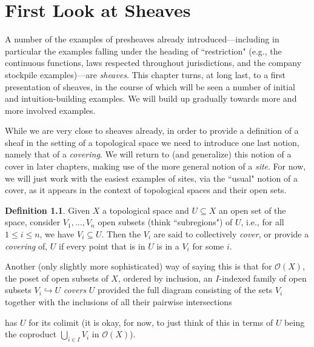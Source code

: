 \documentclass[11pt]{book}
\theoremstyle{definition}
\theoremstyle{definition}
\newtheorem{definition}{Definition}[section]
\theoremstyle{definition}
\theoremstyle{theorem}
\theoremstyle{definition}
\begin{document}
\chapter{First Look at Sheaves}
		A number of the examples of presheaves already introduced---including in particular the examples falling under the heading of ``restriction" (e.g., the continuous functions,  laws respected throughout jurisdictions, and the company stockpile examples)---are \textit{sheaves}. This chapter turns, at long last, to a first presentation of sheaves, in the course of which will be seen a number of initial and intuition-building examples. We will build up gradually towards more and more involved examples. \par 
		While we are very close to sheaves already, in order to provide a definition of a sheaf in the setting of a topological space we need to introduce one last notion, namely that of a \textit{covering}. We will return to (and generalize) this notion of a cover in later chapters, making use of the more general notion of a \textit{site}. For now, we will just work with the easiest examples of sites, via the ``usual" notion of a cover, as it appears in the context of topological spaces and their open sets. 
		\begin{definition}
			Given $X$ a topological space and $U \subseteq  X$ an open set of the space, consider $V_1,\dots, V_n$ open subsets (think ``subregions") of $U$, i.e., for all $1 \leq i \leq n$, we have $V_i \subseteq  U$. Then the $V_i$ are said to collectively \textit{cover}, or provide a \textit{covering} of, $U$ if every point that is in $U$ is in a $V_i$ for some $i$. 
		\end{definition} \noindent 
		Another (only slightly more sophisticated) way of saying this is that for $\mathscr{O}(X)$, the poset of open subsets of $X$, ordered by inclusion, an $I$-indexed family of open subsets $V_i \hookrightarrow U$ \textit{covers} $U$ provided the full diagram consisting of the sets $V_i$ together with the inclusions of all their pairwise intersections 
		\begin{center} 
		\end{center} 
		has $U$ for its colimit (it is okay, for now, to just think of this in terms of $U$ being the coproduct $\bigcup_{i \in I} V_i$ in $\mathscr{O}(X)$). \par 
\end{document}
